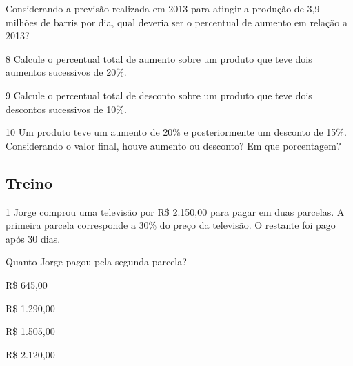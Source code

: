 \begin{escolha}
\begin{boxmedio}
\begin{boxmedio}
{\begin{boxpeq}
\begin{boxpeq}
{\begin{boxpeq}
\begin{boxmedio}
\begin{boxmedio}
\begin{boxpeq}
\begin{boxmedio}
Considerando a previsão realizada em 2013 para atingir a produção de 3,9
milhões de barris por dia, qual deveria ser o percentual de aumento em
relação a 2013?

\begin{boxpeq}

\num{8} Calcule o percentual total de aumento sobre um produto que teve
dois aumentos sucessivos de 20\%.

\begin{boxpeq}

\num{9} Calcule o percentual total de desconto sobre um produto que teve
dois descontos sucessivos de 10\%.

\begin{boxpeq}

\num{10} Um produto teve um aumento de 20\% e posteriormente um desconto
de 15\%. Considerando o valor final, houve aumento ou desconto? Em que 
porcentagem?

\begin{boxpeq}

\section{Treino}

\num{1} Jorge comprou uma televisão por R\$ 2.150,00 para pagar em duas
parcelas. A primeira parcela corresponde a 30\% do preço da
televisão. O restante foi pago após 30 dias.

Quanto Jorge pagou pela segunda parcela?

\begin{escolha}

\item R\$ 645,00
\item R\$ 1.290,00
\item R\$ 1.505,00
\item R\$ 2.120,00
\end{escolha}

\end{boxpeq}
\end{boxpeq}
\end{boxpeq}
\end{boxpeq}
\end{boxmedio}
\end{boxpeq}
\end{boxmedio}
\end{boxmedio}
\end{boxpeq}}
\end{boxpeq}
\end{boxpeq}}
\end{boxmedio}
\end{boxmedio}
\end{escolha}
